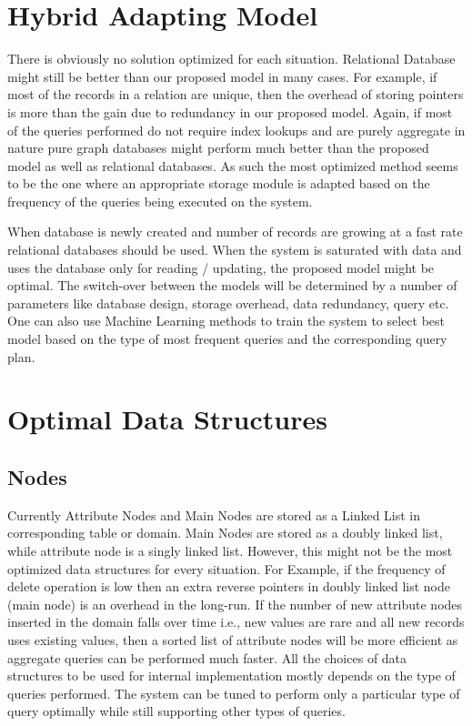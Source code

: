\documentclass[12pt, oneside]{book}
\begin{document}
\section{Hybrid Adapting Model}
There is obviously no solution optimized for each situation. Relational Database might still be better than our proposed model in many cases. For example, if most of the records in a relation are unique, then the overhead of storing pointers is more than the gain due to redundancy in our proposed model. Again, if most of the queries performed do not require index lookups and are purely aggregate in nature pure graph databases might perform much better than the proposed model as well as relational databases. As such the most optimized method seems to be the one where an appropriate storage module is adapted based on the frequency of the queries being executed on the system. \par
When database is newly created and number of records are growing at a fast rate relational databases should be used. When the system is saturated with data and uses the database only for reading / updating, the proposed model might be optimal. The switch-over between the models will be determined by a number of parameters like database design, storage overhead, data redundancy, query etc. One can also use Machine Learning methods to train the system to select best model based on the type of most frequent queries and the corresponding query plan.
\section{Optimal Data Structures}
\subsection{Nodes}
Currently Attribute Nodes and Main Nodes are stored as a Linked List in corresponding table or domain. Main Nodes are stored as a doubly linked list, while attribute node is a singly linked list. However, this might not be the most optimized data structures for every situation. For Example, if the frequency of delete operation is low then an extra reverse pointers in doubly linked list node (main node) is an overhead in the long-run. If the number of new attribute nodes inserted in the domain falls over time i.e., new values are rare and all new records uses existing values, then a sorted list of attribute nodes will be more efficient as aggregate queries can be performed much faster. All the choices of data structures to be used for internal implementation mostly depends on the type of queries performed. The system can be tuned to perform only a particular type of query optimally while still supporting other types of queries.
\end{document}
